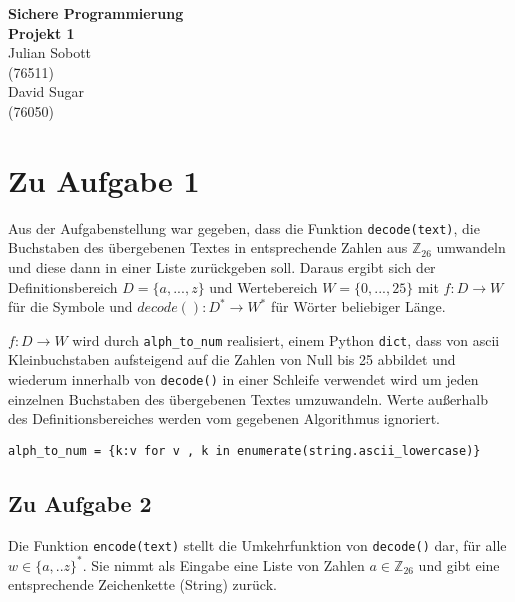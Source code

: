 \documentclass[12pt]{article}
\begin{document}
\begin{center}
  \textbf{\LARGE Sichere Programmierung} \\[1ex]%
  \textbf{\Large Projekt 1}\\[2ex] %
  Julian Sobott \\ %
  (76511) \\ %
  David Sugar \\ %
  (76050) \\ %
  
\end{center}

\section{Zu Aufgabe 1}
Aus der Aufgabenstellung war gegeben, dass die Funktion \texttt{decode(text)}, die Buchstaben des übergebenen Textes in entsprechende Zahlen aus $\mathbb{Z}_{26}$ umwandeln und diese dann in einer Liste zurückgeben soll. Daraus ergibt sich der Definitionsbereich $D = \{a,...,z\}$ und Wertebereich $W = \{0,...,25\}$ mit $f: D \to W$ für die Symbole und $decode(): D^{*} \to W^{*}$ für Wörter beliebiger Länge.  

$f: D \to W$ wird durch \texttt{alph\_to\_num} realisiert, einem Python \texttt{dict}, dass von ascii Kleinbuchstaben aufsteigend auf die Zahlen von Null bis 25 abbildet und wiederum innerhalb von \texttt{decode()} in einer Schleife verwendet wird um jeden einzelnen Buchstaben des übergebenen Textes umzuwandeln. Werte außerhalb des Definitionsbereiches werden vom gegebenen Algorithmus ignoriert.
\begin{lstlisting}
alph_to_num = {k:v for v , k in enumerate(string.ascii_lowercase)}
\end{lstlisting}




\subsection{Zu Aufgabe 2}
Die Funktion \texttt{encode(text)} stellt die Umkehrfunktion von \texttt{decode()} dar, für alle $w \in \{a,..z\}^{*}$. Sie nimmt als Eingabe eine Liste von Zahlen $a \in \mathbb{Z}_{26}$ und gibt eine entsprechende Zeichenkette (String) zurück.
\end{document}
